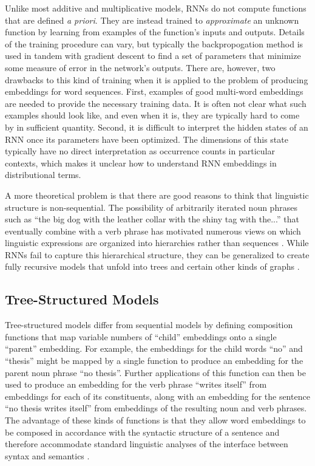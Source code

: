 Unlike most additive and multiplicative models, RNNs do not compute functions that are defined \textit{a priori}. They are instead trained to \textit{approximate} an unknown function by learning from examples of the function's inputs and outputs. Details of the training procedure can vary, but typically the backpropogation method is used in tandem with gradient descent to find a set of parameters that minimize some measure of error in the network's outputs. There are, however, two drawbacks to this kind of training when it is applied to the problem of producing embeddings for word sequences. First, examples of good multi-word embeddings are needed to provide the necessary training data. It is often not clear what such examples should look like, and even when it is, they are typically hard to come by in sufficient quantity. Second, it is difficult to interpret the hidden states of an RNN once its parameters have been optimized. The dimensions of this state typically have no direct interpretation as occurrence counts in particular contexts, which makes it unclear how to understand RNN embeddings in distributional terms. 

A more theoretical problem is that there are good reasons to think that linguistic structure is non-sequential. The possibility of arbitrarily iterated noun phrases such as ``the big dog with the leather collar with the shiny tag with the...'' that eventually combine with a verb phrase has motivated numerous views on which linguistic expressions are organized into hierarchies rather than sequences \citep{Pinker:1994,Harley:2014}. While RNNs fail to capture this hierarchical structure, they can be generalized to create fully recursive models that unfold into trees and certain other kinds of graphs \citep{Socher:2012,Socher:2014,Bottou:2014}. 

\subsection{Tree-Structured Models}

Tree-structured models differ from sequential models by defining composition functions that map variable numbers of ``child'' embeddings onto a single ``parent'' embedding. For example, the embeddings for the child words ``no'' and ``thesis'' might be mapped by a single function to produce an embedding for the parent noun phrase ``no thesis''. Further applications of this function can then be used to produce an embedding for the verb phrase ``writes itself'' from embeddings for each of its constituents, along with an embedding for the sentence ``no thesis writes itself'' from embeddings of the resulting noun and verb phrases. The advantage of these kinds of functions is that they allow word embeddings to be composed in accordance with the syntactic structure of a sentence and therefore accommodate standard linguistic analyses of the interface between syntax and semantics \citep[see e.g.,][]{Szabo:2012}. 

